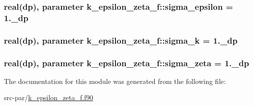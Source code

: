 \hypertarget{classk__epsilon__zeta__f_a652a1e9afd57b34e9f0d9c477d6ea1bd}{
\subsubsection[{sigma\-\_\-epsilon}]{\setlength{\rightskip}{0pt plus 5cm}real(dp), parameter k\-\_\-epsilon\-\_\-zeta\-\_\-f\-::sigma\-\_\-epsilon = 1.\-\_\-dp}}\label{classk__epsilon__zeta__f_a652a1e9afd57b34e9f0d9c477d6ea1bd}
\hypertarget{classk__epsilon__zeta__f_af3d1153ca4d94b086f0798fbd5f42e69}{
\subsubsection[{sigma\-\_\-k}]{\setlength{\rightskip}{0pt plus 5cm}real(dp), parameter k\-\_\-epsilon\-\_\-zeta\-\_\-f\-::sigma\-\_\-k = 1.\-\_\-dp}}\label{classk__epsilon__zeta__f_af3d1153ca4d94b086f0798fbd5f42e69}
\hypertarget{classk__epsilon__zeta__f_a2e51be2b8f0a253169c6cae4be84d58d}{
\subsubsection[{sigma\-\_\-zeta}]{\setlength{\rightskip}{0pt plus 5cm}real(dp), parameter k\-\_\-epsilon\-\_\-zeta\-\_\-f\-::sigma\-\_\-zeta = 1.\-\_\-dp}}\label{classk__epsilon__zeta__f_a2e51be2b8f0a253169c6cae4be84d58d}


The documentation for this module was generated from the following file\-:\begin{DoxyCompactItemize}
\item 
src-\/par/\hyperlink{k__epsilon__zeta__f_8f90}{k\-\_\-epsilon\-\_\-zeta\-\_\-f.\-f90}\end{DoxyCompactItemize}
